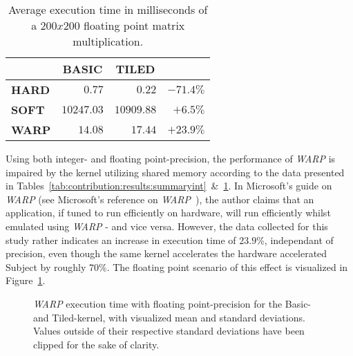 \documentclass[a4paper,twocolumn,10pt]{article}
\begin{document}
\begin{table}[hbt]
\begin{center}
\begin{tabular}{r|r|r|r|}
	\cline{2-3}
							& \multicolumn{1}{|c|}{\textbf{BASIC}} & \multicolumn{1}{|c|}{\textbf{TILED}}	\\ \hline
	\multicolumn{1}{|l|}{\textbf{HARD}}	& $0.77$			& $0.22$		& $-71.4\%$  				\\ \hline
	\multicolumn{1}{|l|}{\textbf{SOFT}}	& $10247.03$		& $10909.88$	& $+6.5\%$   				\\ \hline
	\multicolumn{1}{|l|}{\textbf{WARP}}	& $14.08$			& $17.44$		& $+23.9\%$  				\\ \hline
\end{tabular}
\end{center}
\caption{Average execution time in milliseconds of a $200x200$ floating point matrix multiplication.}
\label{tab:contribution:results:summaryfloat}
\end{table}

Using both integer- and floating point-precision, the performance of \textit{WARP} is impaired by the kernel utilizing shared memory according to the data presented in Tables~\ref{tab:contribution:results:summaryint}~\&~\ref{tab:contribution:results:summaryfloat}. In Microsoft's guide on \textit{WARP} (see Microsoft's reference on \textit{WARP}~), the author claims that an application, if tuned to run efficiently on hardware, will run efficiently whilst emulated using \textit{WARP} - and vice versa. However, the data collected for this study rather indicates an increase in execution time of $23.9$\%, independant of precision, even though the same kernel accelerates the hardware accelerated Subject by roughly $70$\%. The floating point scenario of this effect is visualized in Figure~\ref{fig:contribution:results:warp:msswarp}.

\begin{figure}[htb]
\begin{center}
	\resizebox{ \columnwidth }{!}{}
	\caption{\textit{WARP} execution time with floating point-precision for the Basic- and Tiled-kernel, with visualized mean and standard deviations. Values outside of their respective standard deviations have been clipped for the sake of clarity.}
	\label{fig:contribution:results:warp:msswarp}
\end{center}
\end{figure}
\end{document}
